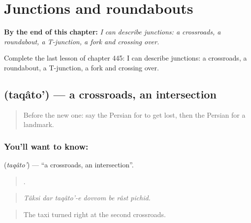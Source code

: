 
\chapter{Junctions and roundabouts}
\label{ch:fa-junctions-and-roundabouts}

\begin{chapteropening}
\textbf{By the end of this chapter:} \emph{I can describe junctions: a crossroads, a roundabout, a T-junction, a fork and crossing over.}

Complete the last lesson of chapter 445: I can describe junctions: a crossroads, a roundabout, a T-junction, a fork and crossing over.
\end{chapteropening}

\section[\texorpdfstring{\fa{تقاطع} (taqâto')}{تقاطع (taqâto')}]{ (taqâto') — a crossroads, an intersection}

\label{lesson:FA-C445-taqato}



\begin{quote}
Before the new one: say the Persian for to get lost, then the Persian for a landmark.
\end{quote}

\subsection*{You'll want to know: }
\textbf{} (\emph{taqâto'}) — \textquotedblleft{}a crossroads, an intersection\textquotedblright{}.

\begin{quote}
      .
\end{quote}

\begin{quote}
\emph{Tâksi dar taqâto'-e dovvom be râst pichid.}
\end{quote}

\begin{quote}
The taxi turned right at the second crossroads.
\end{quote}

